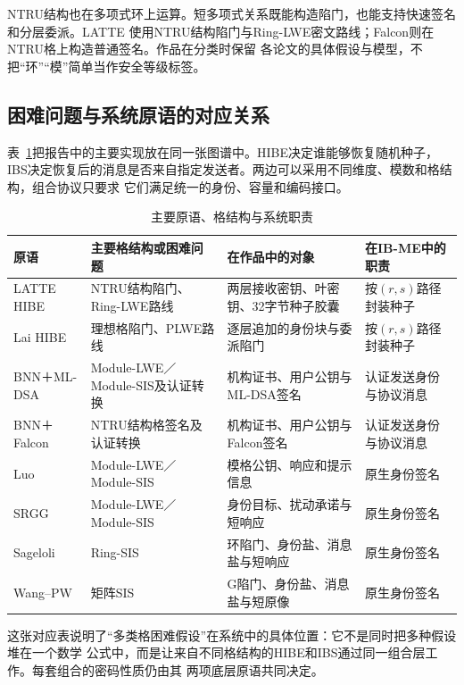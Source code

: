 NTRU结构也在多项式环上运算。短多项式关系既能构造陷门，也能支持快速签名和分层委派。LATTE
使用NTRU结构陷门与Ring-LWE密文路线；Falcon则在NTRU格上构造普通签名。作品在分类时保留
各论文的具体假设与模型，不把“环”“模”简单当作安全等级标签。

\subsection{困难问题与系统原语的对应关系}

表~\ref{tab:assumption-map}把报告中的主要实现放在同一张图谱中。HIBE决定谁能够恢复随机种子，
IBS决定恢复后的消息是否来自指定发送者。两边可以采用不同维度、模数和格结构，组合协议只要求
它们满足统一的身份、容量和编码接口。

\begin{table}[H]
\centering\small
\caption{主要原语、格结构与系统职责}
\label{tab:assumption-map}
\begin{tabularx}{\textwidth}{@{}>{\raggedright\arraybackslash}p{}>{\raggedright\arraybackslash}p{}>{\raggedright\arraybackslash}p{}>{\raggedright\arraybackslash}X@{}}
\toprule
\rowcolor{black!8} 原语 & 主要格结构或困难问题 & 在作品中的对象 & 在IB-ME中的职责 \\
\midrule
LATTE HIBE & NTRU结构陷门、Ring-LWE路线 & 两层接收密钥、叶密钥、32字节种子胶囊 & 按$(r,s)$路径封装种子 \\
Lai HIBE & 理想格陷门、PLWE路线 & 逐层追加的身份块与委派陷门 & 按$(r,s)$路径封装种子 \\
BNN＋ML-DSA & Module-LWE／Module-SIS及认证转换 & 机构证书、用户公钥与ML-DSA签名 & 认证发送身份与协议消息 \\
BNN＋Falcon & NTRU结构格签名及认证转换 & 机构证书、用户公钥与Falcon签名 & 认证发送身份与协议消息 \\
Luo & Module-LWE／Module-SIS & 模格公钥、响应和提示信息 & 原生身份签名 \\
SRGG & Module-LWE／Module-SIS & 身份目标、扰动承诺与短响应 & 原生身份签名 \\
Sageloli & Ring-SIS & 环陷门、身份盐、消息盐与短响应 & 原生身份签名 \\
Wang--PW & 矩阵SIS & G陷门、身份盐、消息盐与短原像 & 原生身份签名 \\
\bottomrule
\end{tabularx}
\end{table}

这张对应表说明了“多类格困难假设”在系统中的具体位置：它不是同时把多种假设堆在一个数学
公式中，而是让来自不同格结构的HIBE和IBS通过同一组合层工作。每套组合的密码性质仍由其
两项底层原语共同决定。

